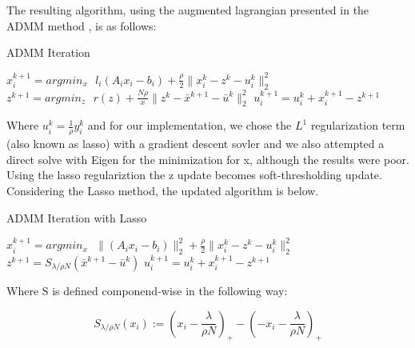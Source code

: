 \documentclass[letterpaper,11pt,onecolumn]{article}
\begin{document}
The resulting algorithm, using the augmented lagrangian presented in the ADMM method \cite{ADMM}, is as follows:

\begin{center}
\begin{algorithm}
\caption{ADMM Iteration}
\begin{algorithmic}[1]
	\STATE $x_{i}^{k+1} = argmin_{x} \: \: \: l_{i}(A_{i}x_{i} - b_{i}) + \frac{\rho}{2} \| x_{i}^{k} - z^{k} - u_{i}^{k} \|_{2}^{2}$ 
	\STATE $z^{k+1} = argmin_{z} \: \: \: r(z) + \frac{N \rho}{x} \| z^{k} - \bar{x}^{k+1} - \bar{u}^{k} \|_{2}^{2} $
	\STATE $u_{i}^{k+1} = u_{i}^{k} + x_{i}^{k+1} - z^{k+1} $ 
  \end{algorithmic}
\end{algorithm}
\end{center}

Where $u_{i}^{k} = \frac{1}{\rho} y_{i}^{k}$ and for our implementation, we chose the $L^{1}$ regularization term (also known as lasso) with a gradient descent sovler and we also attempted a direct solve with Eigen for the minimization for x, although the results were poor. Using the lasso regulariztion the z update becomes soft-thresholding update. Considering the Lasso method, the updated algorithm is below.

\begin{center}
\begin{algorithm}
\caption{ADMM Iteration with Lasso}
\begin{algorithmic}[1]
  \STATE $x_{i}^{k+1} = argmin_{x} \: \: \: \|(A_{i}x_{i} - b_{i})\|_{2}^{2} + \frac{\rho}{2} \| x_{i}^{k} - z^{k} - u_{i}^{k} \|_{2}^{2}$ 
  \STATE $z^{k+1} = S_{\lambda/\rho N} (\bar{x}^{k+1} - \bar{u}^{k})$
	\STATE $u_{i}^{k+1} = u_{i}^{k} + x_{i}^{k+1} - z^{k+1} $ 
  \end{algorithmic}
\end{algorithm}
\end{center}

Where S is defined componend-wise in the following way:
\begin{center}
	\begin{equation}
	  S_{\lambda/\rho N}(x_{i}) := (x_{i} - \frac{\lambda}{\rho N})_{+} - (-x_{i} - \frac{\lambda}{\rho N})_{+}
	\end{equation}
\end{center}
\end{document}
